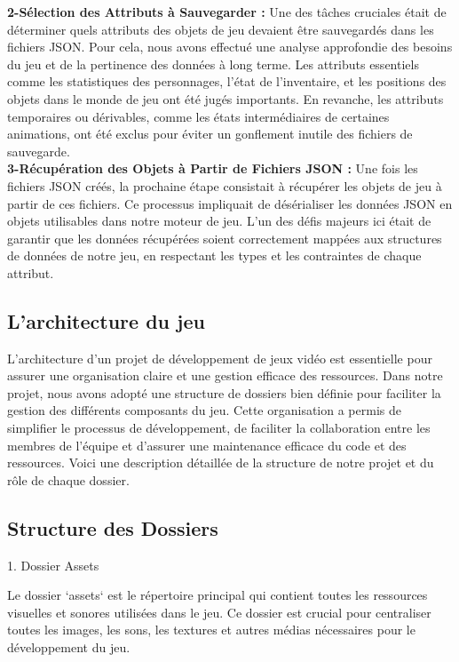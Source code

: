 \textbf{2-Sélection des Attributs à Sauvegarder :}
Une des tâches cruciales était de déterminer quels attributs des objets de jeu devaient être sauvegardés dans les fichiers JSON. Pour cela, 
nous avons effectué une analyse approfondie des besoins du jeu et de la pertinence des données à long terme. Les attributs essentiels comme les
statistiques des personnages, l'état de l'inventaire, et les positions des objets dans le monde de jeu ont été jugés importants. En revanche, 
les attributs temporaires ou dérivables, comme les états intermédiaires de certaines animations, ont été exclus pour éviter un gonflement inutile des fichiers de sauvegarde.
\\

\textbf{3-Récupération des Objets à Partir de Fichiers JSON :}
Une fois les fichiers JSON créés, la prochaine étape consistait à récupérer les objets de jeu à partir de ces fichiers. 
Ce processus impliquait de désérialiser les données JSON en objets utilisables dans notre moteur de jeu. 
L'un des défis majeurs ici était de garantir que les données récupérées soient correctement mappées aux structures de
données de notre jeu, en respectant les types et les contraintes de chaque attribut.


\subsection{L'architecture du jeu}




L'architecture d'un projet de développement de jeux vidéo est essentielle pour assurer une organisation claire et une gestion efficace des ressources.
 Dans notre projet, nous avons adopté une structure de dossiers bien définie pour faciliter la gestion des différents composants du jeu. Cette organisation 
 a permis de simplifier le processus de développement, de faciliter la collaboration entre les membres de l'équipe et d'assurer une maintenance efficace du code
  et des ressources. Voici une description détaillée de la structure de notre projet et du rôle de chaque dossier.

\subsection*{Structure des Dossiers}

1. Dossier Assets

   Le dossier `assets` est le répertoire principal qui contient toutes les ressources visuelles et sonores utilisées dans le jeu. 
   Ce dossier est crucial pour centraliser toutes les images, les sons, les textures et autres médias nécessaires pour le développement du jeu.

